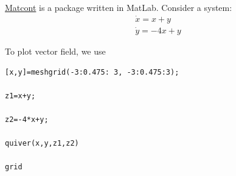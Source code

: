 \hyperlink{http://www.matcont.ugent.be/}{Matcont} is a package written
in MatLab.  Consider a system:
\begin{equation}
  \label{eq:654}
  \begin{split}
    \dot{x} = x + y \\
    \dot{y} = -4x + y
  \end{split}
\end{equation}

To plot vector field, we use
\begin{lstlisting}
[x,y]=meshgrid(-3:0.475: 3, -3:0.475:3);

z1=x+y;

z2=-4*x+y;

quiver(x,y,z1,z2)

grid 
\end{lstlisting}








